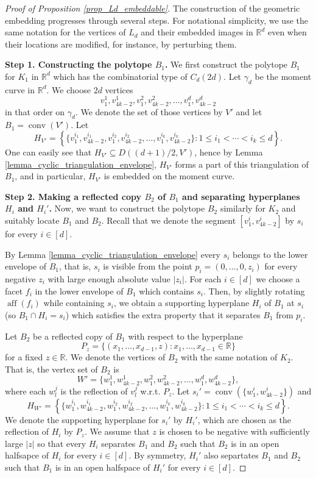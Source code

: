 \documentclass{article}
\newcommand{\RR}{\mathbb{R}}
\theoremstyle{definition}
\DeclareMathOperator{\conv}{conv}
\DeclareMathOperator{\aff}{aff}
\begin{document}
\begin{proof}[Proof of Proposition \ref{prop_Ld_embeddable}]
The construction of the geometric embedding progresses through several steps. For notational simplicity, we use the same notation for the vertices of $L_d$ and their embedded images in $\RR^d$ even when their locations are modified, for instance, by perturbing them.
	
	\medskip 

	\textbf{Step 1. Constructing the 
 polytope $B_1$.} We first construct the polytope $B_1$  for $K_1$ in $\RR^d$ which has the combinatorial type of $C_d(2d)$. Let $\gamma_d$ be the moment curve in $\RR^d$. We choose $2d$ vertices
	$$v_1^1, v_{4k-2}^1, v_1^2, v_{4k-2}^2, \dots,  v_1^d, v_{4k-2}^d$$
	in that order on $\gamma_d$. We denote the set of those vertices by $V'$ and let $B_1=\conv(V')$. Let
	$$H_{V'}=\left\{\{v_1^{i_1}, v_{4k-2}^{i_1},v_{1}^{i_2}, v_{4k-2}^{i_2},\dots, v_1^{i_k}, v_{4k-2}^{i_k}\}:1\leq i_1<\cdots <i_k\leq d\right\}.$$
	One can easily see that $H_{V'} \subseteq D((d+1)/2, V')$, hence by Lemma \ref{lemma_cyclic_triangulation_envelope},
	$H_{V'}$ forms a part of this triangulation of $B_1$, and in particular, $H_{V'}$ is embedded on the moment curve.
	
	\medskip 
	
\textbf{Step 2. Making a reflected copy $B_2$ of $B_1$ and separating hyperplanes $H_i$ and $H_i'$.}
Now, we want to construct the polytope $B_2$ similarly for $K_2$ and suitably locate $B_1$ and $B_2$. Recall that we denote the segment $[v_1^i, v_{4k-2}^i]$ by $s_i$ for every $i\in [d]$. 

By Lemma \ref{lemma_cyclic_triangulation_envelope} 
every $s_i$ belongs to the lower envelope of $B_1$, that is, $s_i$ is visible from the point
$p_i=(0,\dots, 0, z_i)$ for every negative $z_i$ with large enough absolute value $|z_i|$.
For each $i \in [d]$ we choose a facet $f_i$ in the lower envelope of $B_1$ which contains $s_i$. Then, by slightly rotating $\aff(f_i)$ while containing $s_i$, we obtain a supporting hyperplane $H_i$ of $B_1$ at $s_i$ (so $B_1 \cap H_i = s_i$) which satisfies the extra property that it separates $B_1$ from $p_i$.

Let $B_2$ be a reflected copy of $B_1$ with respect to the hyperplane 
\[P_z=\{(x_1, \dots, x_{d-1}, z): x_1,\dots, x_{d-1}\in \RR \}\]
for a fixed $z \in \RR$. We denote the vertices of $B_2$ with the same notation 
of $K_2$. That is, the vertex set of $B_2$ is
$$W'=\{w_1^1, w_{4k-2}^1, w_1^2, w_{4k-2}^2, \dots,  w_1^d, w_{4k-2}^d\},$$
where each $w^j_l$ is the reflection of $v^j_l$ w.r.t. $P_z$. 
Let $s_i'=\conv(\{w_1^i, w_{4k-2}^i\})$ and
$$H_{W'}=\left\{\{w_1^{i_1}, w_{4k-2}^{i_1},w_{1}^{i_2}, w_{4k-2}^{i_2},\dots, w_1^{i_k}, w_{4k-2}^{i_k}\}:1\leq i_1<\cdots <i_k\leq d\right\}.$$
We denote the supporting hyperplane for $s_i'$ by $H_i'$, which are chosen as the reflection of $H_i$ by $P_z$. We assume that $z$ is chosen to be negative with sufficiently large $|z|$ so that every $H_i$ separates $B_1$ and $B_2$ such that $B_2$ is in an open halfsapce of $H_i$ for every $i \in [d]$. By symmetry, $H_i'$ also separtates $B_1$ and $B_2$ such that $B_1$ is in an open halfspace of $H_i'$ for every $i \in [d]$.



\end{proof}
\end{document}
